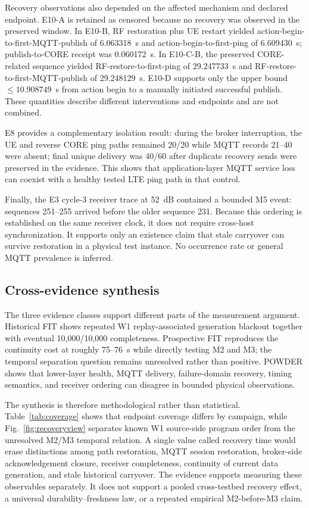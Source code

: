 \documentclass[journal]{IEEEtran}
\begin{document}
Recovery observations also depended on the affected mechanism and declared endpoint. E10-A is retained as censored because no recovery was observed in the preserved window. In E10-B, RF restoration plus UE restart yielded action-begin-to-first-MQTT-publish of 6.063318~s and action-begin-to-first-ping of 6.609430~s; publish-to-CORE receipt was 0.060172~s. In E10-C-B, the preserved CORE-related sequence yielded RF-restore-to-first-ping of 29.247733~s and RF-restore-to-first-MQTT-publish of 29.248129~s. E10-D supports only the upper bound $\leq 10.908749$~s from action begin to a manually initiated successful publish. These quantities describe different interventions and endpoints and are not combined.

E8 provides a complementary isolation result: during the broker interruption, the UE and reverse CORE ping paths remained 20/20 while MQTT records 21--40 were absent; final unique delivery was 40/60 after duplicate recovery sends were preserved in the evidence. This shows that application-layer MQTT service loss can coexist with a healthy tested LTE ping path in that control.

Finally, the E3 cycle-3 receiver trace at 52~dB contained a bounded M5 event: sequences 251--255 arrived before the older sequence 231. Because this ordering is established on the same receiver clock, it does not require cross-host synchronization. It supports only an existence claim that stale carryover can survive restoration in a physical test instance. No occurrence rate or general MQTT prevalence is inferred.

\subsection{Cross-evidence synthesis}

The three evidence classes support different parts of the measurement argument. Historical FIT shows repeated W1 replay-associated generation blackout together with eventual 10,000/10,000 completeness. Prospective FIT reproduces the continuity cost at roughly 75--76~s while directly testing M2 and M3; the temporal separation question remains unresolved rather than positive. POWDER shows that lower-layer health, MQTT delivery, failure-domain recovery, timing semantics, and receiver ordering can disagree in bounded physical observations.

The synthesis is therefore methodological rather than statistical. Table~\ref{tab:coverage} shows that endpoint coverage differs by campaign, while Fig.~\ref{fig:recoveryview} separates known W1 source-side program order from the unresolved M2/M3 temporal relation. A single value called recovery time would erase distinctions among path restoration, MQTT session restoration, broker-side acknowledgement closure, receiver completeness, continuity of current data generation, and stale historical carryover. The evidence supports measuring these observables separately. It does not support a pooled cross-testbed recovery effect, a universal durability--freshness law, or a repeated empirical M2-before-M3 claim.
\end{document}
